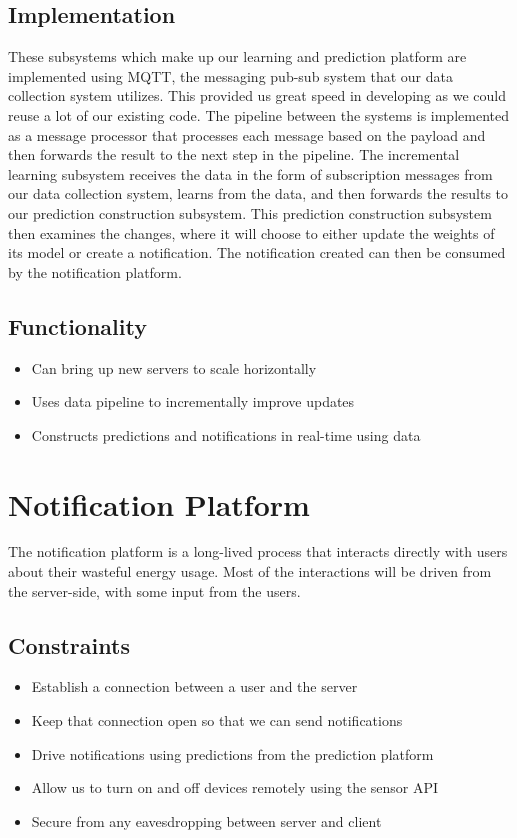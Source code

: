 \documentclass[conference]{IEEEtran}
\begin{document}
\subsection{Implementation}
These subsystems which make up our learning and prediction platform are implemented using MQTT, the messaging pub-sub system that our data collection system utilizes. This provided us great speed in developing as we could reuse a lot of our existing code. The pipeline between the systems is implemented as a message processor that processes each message based on the payload and then forwards the result to the next step in the pipeline. The incremental learning subsystem receives the data in the form of subscription messages from our data collection system, learns from the data, and then forwards the results to our prediction construction subsystem. This prediction construction subsystem then examines the changes, where it will choose to either update the weights of its model or create a notification. The notification created can then be consumed by the notification platform.

\subsection{Functionality}
\begin{itemize}
    \item Can bring up new servers to scale horizontally
    \item Uses data pipeline to incrementally improve updates
    \item Constructs predictions and notifications in real-time using data
\end{itemize}

\section{Notification Platform}\label{Notification Platform}
The notification platform is a long-lived process that interacts directly with users about their wasteful energy usage. Most of the interactions will be driven from the server-side, with some input from the users.

\subsection{Constraints}
\begin{itemize}
    \item Establish a connection between a user and the server
    \item Keep that connection open so that we can send notifications
    \item Drive notifications using predictions from the prediction platform
    \item Allow us to turn on and off devices remotely using the sensor API
    \item Secure from any eavesdropping between server and client
\end{itemize}
\end{document}
